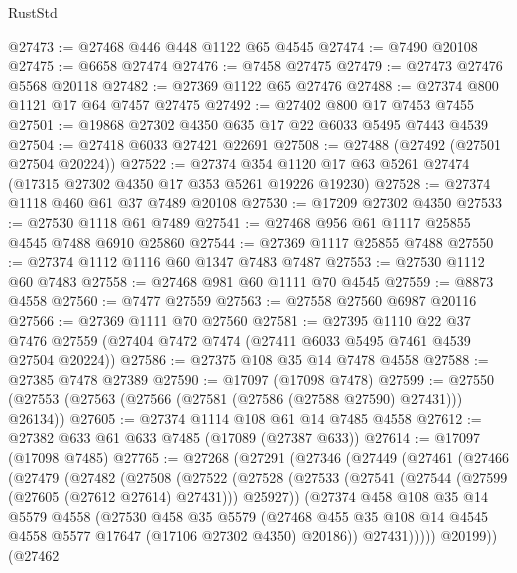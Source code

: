 \begin{lexlean}{RustStd}
\begin{coremodule}
@27473 := @27468 @446 @448 @1122 @65 @4545
@27474 := @7490 @20108
@27475 := @6658 @27474
@27476 := @7458 @27475
@27479 := @27473 @27476 @5568 @20118
@27482 := @27369 @1122 @65 @27476
@27488 := @27374 @800 @1121 @17 @64 @7457 @27475
@27492 := @27402 @800 @17 @7453 @7455
@27501 := @19868 @27302 @4350 @635 @17 @22 @6033 @5495 @7443 @4539
@27504 := @27418 @6033 @27421 @22691
@27508 := @27488 (@27492 (@27501 @27504 @20224))
@27522 := @27374 @354 @1120 @17 @63 @5261 @27474 (@17315 @27302 @4350 @17 @353 @5261 @19226 @19230)
@27528 := @27374 @1118 @460 @61 @37 @7489 @20108
@27530 := @17209 @27302 @4350
@27533 := @27530 @1118 @61 @7489
@27541 := @27468 @956 @61 @1117 @25855 @4545 @7488 @6910 @25860
@27544 := @27369 @1117 @25855 @7488
@27550 := @27374 @1112 @1116 @60 @1347 @7483 @7487
@27553 := @27530 @1112 @60 @7483
@27558 := @27468 @981 @60 @1111 @70 @4545
@27559 := @8873 @4558
@27560 := @7477 @27559
@27563 := @27558 @27560 @6987 @20116
@27566 := @27369 @1111 @70 @27560
@27581 := @27395
    @1110
    @22
    @37
    @7476
    @27559
    (@27404 @7472 @7474 (@27411 @6033 @5495 @7461 @4539 @27504 @20224))
@27586 := @27375 @108 @35 @14 @7478 @4558
@27588 := @27385 @7478 @27389
@27590 := @17097 (@17098 @7478)
@27599 := @27550 (@27553 (@27563 (@27566 (@27581 (@27586 (@27588 @27590) @27431))) @26134))
@27605 := @27374 @1114 @108 @61 @14 @7485 @4558
@27612 := @27382 @633 @61 @633 @7485 (@17089 (@27387 @633))
@27614 := @17097 (@17098 @7485)
@27765 := @27268
    (@27291
      (@27346
        (@27449
          (@27461
            (@27466
              (@27479
                (@27482
                  (@27508
                    (@27522
                      (@27528
                        (@27533 (@27541 (@27544 (@27599 (@27605 (@27612 @27614) @27431))) @25927))
                        (@27374
                          @458
                          @108
                          @35
                          @14
                          @5579
                          @4558
                          (@27530
                            @458
                            @35
                            @5579
                            (@27468
                              @455
                              @35
                              @108
                              @14
                              @4545
                              @4558
                              @5577
                              @17647
                              (@17106 @27302 @4350)
                              @20186))
                          @27431)))))
                @20199))
            (@27462

\end{coremodule}
\end{lexlean}
